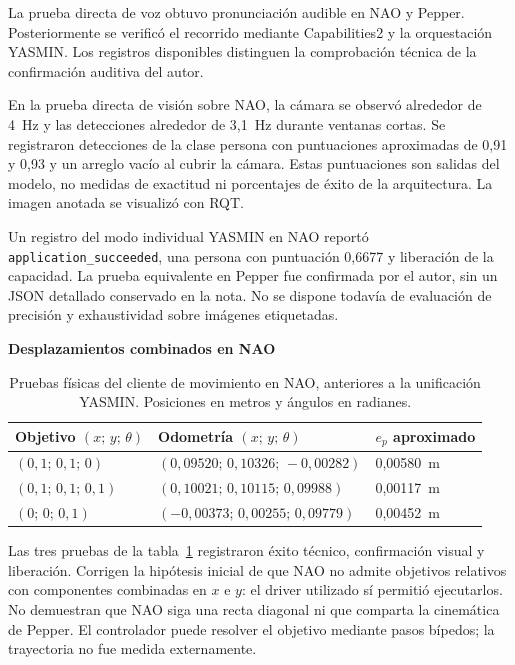 \documentclass[11pt,letterpaper]{article}
\newcommand{\code}[1]{\nolinkurl{#1}}
\begin{document}
La prueba directa de voz obtuvo pronunciación audible en NAO y Pepper. Posteriormente se verificó el recorrido mediante Capabilities2 y la orquestación YASMIN. Los registros disponibles distinguen la comprobación técnica de la confirmación auditiva del autor.

En la prueba directa de visión sobre NAO, la cámara se observó alrededor de 4~Hz y las detecciones alrededor de 3,1~Hz durante ventanas cortas. Se registraron detecciones de la clase persona con puntuaciones aproximadas de 0,91 y 0,93 y un arreglo vacío al cubrir la cámara. Estas puntuaciones son salidas del modelo, no medidas de exactitud ni porcentajes de éxito de la arquitectura. La imagen anotada se visualizó con RQT.

Un registro del modo individual YASMIN en NAO reportó \code{application_succeeded}, una persona con puntuación 0,6677 y liberación de la capacidad. La prueba equivalente en Pepper fue confirmada por el autor, sin un JSON detallado conservado en la nota. No se dispone todavía de evaluación de precisión y exhaustividad sobre imágenes etiquetadas.

\par\medskip\noindent\textbf{Desplazamientos combinados en NAO}\par

\begin{table}[htbp]
\centering\small
\caption{Pruebas físicas del cliente de movimiento en NAO, anteriores a la unificación YASMIN. Posiciones en metros y ángulos en radianes.}\label{tab:naomove}
\begin{tabular}{lll}
\toprule
Objetivo $(x;\,y;\,\theta)$ & Odometría $(x;\,y;\,\theta)$ & $e_p$ aproximado \\
\midrule
$(0{,}1;\,0{,}1;\,0)$ & $(0{,}09520;\,0{,}10326;\,-0{,}00282)$ & 0,00580~m \\
$(0{,}1;\,0{,}1;\,0{,}1)$ & $(0{,}10021;\,0{,}10115;\,0{,}09988)$ & 0,00117~m \\
$(0;\,0;\,0{,}1)$ & $(-0{,}00373;\,0{,}00255;\,0{,}09779)$ & 0,00452~m \\
\bottomrule
\end{tabular}
\end{table}

Las tres pruebas de la tabla~\ref{tab:naomove} registraron éxito técnico, confirmación visual y liberación. Corrigen la hipótesis inicial de que NAO no admite objetivos relativos con componentes combinadas en $x$ e $y$: el driver utilizado sí permitió ejecutarlos. No demuestran que NAO siga una recta diagonal ni que comparta la cinemática de Pepper. El controlador puede resolver el objetivo mediante pasos bípedos; la trayectoria no fue medida externamente.
\end{document}
